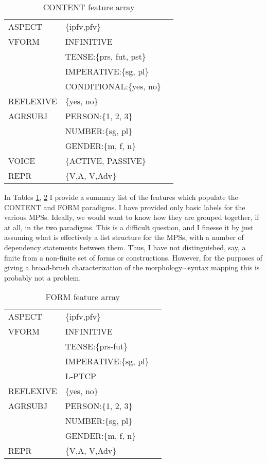\documentclass[output=paper,
modfonts
]{LSP/langsci}
\begin{document}
\begin{table}[ht]
\begin{center}
\begin{tabular}{lll}\toprule

ASPECT		&\{ipfv,pfv\}\\
VFORM	&INFINITIVE\\
		&TENSE:\{prs, fut, pst\}\\
		&IMPERATIVE:\{sg, pl\}\\
		&CONDITIONAL:\{yes, no\}\\
REFLEXIVE	&\{yes, no\}\\
AGRSUBJ	&PERSON:\{1, 2, 3\}\\
		&NUMBER:\{sg, pl\}\\
		&GENDER:\{m, f, n\}\\	
VOICE	&\{ACTIVE, PASSIVE\}\\ 
REPR	&\{\lab V,A\rab, \lab V,Adv\rab\}\\
\bottomrule

\end{tabular}
\end{center}
\caption{CONTENT feature array}
\label{table:fsets:CONTENT}
\end{table}%
  
   

In  Tables  \ref{table:fsets:CONTENT}, \ref{table:fsets:FORM} I provide a summary list of the features which populate the CONTENT and FORM paradigms. %
I have provided only basic labels for the various MPSs. Ideally, we would want to know how they are grouped together, if at all, in the two paradigms. This is a difficult question, and I finesse it by just assuming what is effectively a list structure for the MPSs, with a number of dependency statements between them. Thus, I have not distinguished, say, a finite from a non-finite set of forms or constructions. However, for the purposes of giving a broad-brush characterization of the morphology$\sim$syntax mapping this is probably not a problem. 
 

\begin{table}
\begin{center}
\begin{tabular}{lll}	\toprule
ASPECT		&\{ipfv,pfv\}\\		
VFORM	&INFINITIVE\\
		&TENSE:\{prs-fut\}\\
		&IMPERATIVE:\{sg, pl\}\\
		&L-PTCP\\
REFLEXIVE	&\{yes, no\}\\
AGRSUBJ	&PERSON:\{1, 2, 3\}\\
		&NUMBER:\{sg, pl\}\\
		&GENDER:\{m, f, n\}\\	
REPR	&\{\lab V,A\rab, \lab V,Adv\rab\}\\
\bottomrule
\end{tabular}
\caption{FORM feature array} 
\label{table:fsets:FORM}
\end{center}
\end{table}
\end{document}
